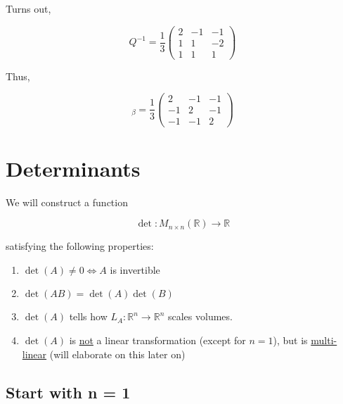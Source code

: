 \documentclass{article}
\newtheorem{one minute paper}[theorem]{One Minute Paper}
\begin{document}
Turns out, 

\begin{equation}
    Q^{-1} = \frac{1}{3}\begin{pmatrix}
        2 & -1 & -1 \\
        1 & 1 & -2 \\
        1 & 1 & 1
    \end{pmatrix}
\end{equation}

Thus,

\begin{equation}
    [T]_\beta = \frac{1}{3}\begin{pmatrix}
        2 & -1 & -1 \\
        -1 & 2 & -1 \\
        -1 & -1 & 2
    \end{pmatrix}
\end{equation}

\newpage

\section*{Determinants}

We will construct a function 

\begin{equation}
    \det : M_{n \times n}(\mathbb{R}) \rightarrow \mathbb{R}
\end{equation}

satisfying the following properties:

\begin{enumerate}
    \item $\det(A) \neq 0 \iff A $ is invertible 
    \item $\det(AB) = \det(A)\det(B)$
    \item $\det(A)$ tells how $L_A: \mathbb{R}^n \rightarrow \mathbb{R}^n$ scales volumes. 
    \item $\det(A)$ is \underline{not} a linear transformation (except for $n=1$), but is \underline{multi-linear} (will elaborate on this later on)
\end{enumerate}


\subsection*{Start with n = 1}
\end{document}
